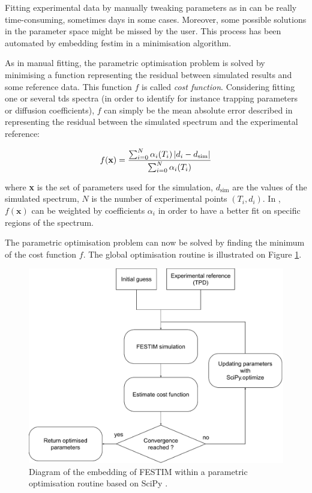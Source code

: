 Fitting experimental data by manually tweaking parameters as in  can be really time-consuming, sometimes days in some cases.
Moreover, some possible solutions in the parameter space might be missed by the user.
This process has been automated by embedding \gls{festim} in a minimisation algorithm.

As in manual fitting, the parametric optimisation problem is solved by minimising a function representing the residual between simulated results and some reference data.
This function $f$ is called \textit{cost function}.
Considering fitting one or several \gls{tds} spectra (in order to identify for instance trapping parameters or diffusion coefficients), $f$ can simply be the mean absolute error described in  representing the residual between the simulated spectrum and the experimental reference: 

\begin{equation}
    f(\textbf{x})=\frac{\sum_{i=0}^{N}  \alpha_i(T_i)\left| d_{i}-d_{\mathrm{sim}}\right|}{\sum_{i=0}^{N}  \alpha_i(T_i)}
    \labeq{cost function}
\end{equation}

where \textbf{x} is the set of parameters used for the simulation, $d_\mathrm{sim}$ are the values of the simulated spectrum, $N$ is the number of experimental points $(T_i, d_i)$.
In , $f(\textbf{x})$ can be weighted by coefficients $\alpha_i$ in order to have a better fit on specific regions of the spectrum.

The parametric optimisation problem can now be solved by finding the minimum of the cost function $f$.
The global optimisation routine is illustrated on Figure \ref{fig:diagramm}.
\begin{figure}
    \centering
    \includegraphics[width=\linewidth]{Figures/Chapter3/Parametric_optimisation/algorithm diagram.pdf}
    \caption{Diagram of the embedding of FESTIM within a parametric optimisation routine based on SciPy \cite{virtanen_scipy_2020}.}
    \label{fig:diagramm}
\end{figure}

